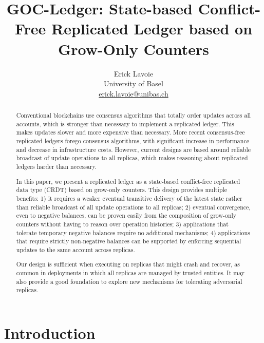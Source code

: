 \documentclass[9pt, oneside]{article}   	%
\title{GOC-Ledger: State-based Conflict-Free Replicated Ledger based on Grow-Only Counters}
\author{Erick Lavoie \\
University of Basel \\
\href{mailto:erick.lavoie@unibas.ch}{erick.lavoie@unibas.ch}}
\begin{document}
\maketitle


\begin{abstract}
Conventional blockchains use consensus algorithms that totally order updates across all accounts, which is stronger than necessary to implement a replicated ledger. This makes updates slower and more expensive than necessary. More recent consensus-free replicated ledgers forego consensus algorithms, with significant increase in performance and decrease in infrastructure costs. However, current designs are based around reliable broadcast of update operations to all replicas, which makes reasoning about replicated ledgers harder than necessary.

In this paper, we present a replicated ledger as a state-based conflict-free replicated data type (CRDT) based on grow-only counters. This design provides multiple benefits: 1) it requires a weaker eventual transitive delivery of the latest state rather than reliable broadcast of all update operations to all replicas; 2) eventual convergence, even to negative balances, can be proven easily from the composition of grow-only counters without having to  reason over operation histories; 3) applications that tolerate temporary negative balances require no additional mechanisms; 4) applications that require strictly non-negative balances can be supported by enforcing sequential updates to the same account across replicas.

Our design is sufficient when executing on replicas that might crash and recover, as common in deployments in which all replicas are managed by trusted entities. It may also provide a good foundation to explore new mechanisms for tolerating adversarial replicas.
\end{abstract}

\section{Introduction}
\label{sec:introduction}
\end{document}
